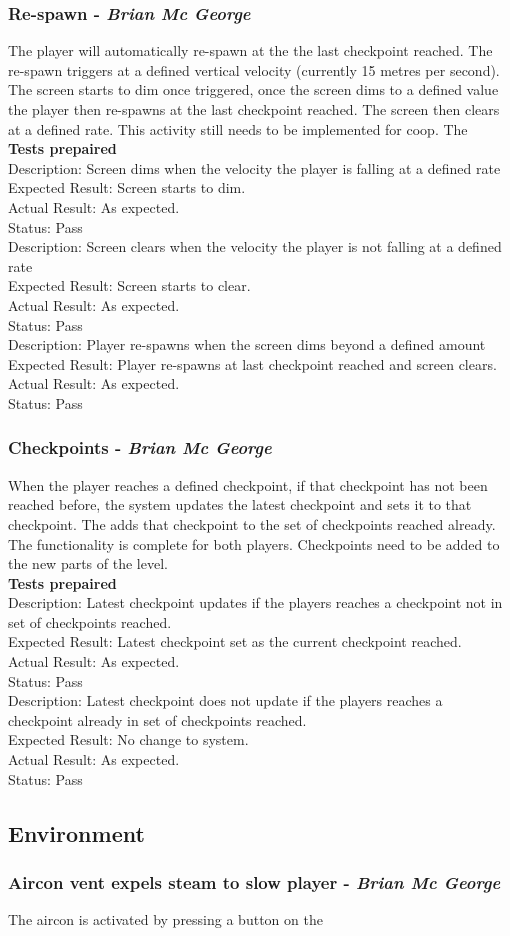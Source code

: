 \documentclass[a4paper,10pt]{article}
\begin{document}
\subsubsection{Re-spawn - \textit{Brian Mc George}}
The player will automatically re-spawn at the the last checkpoint reached. The re-spawn triggers at a defined vertical velocity (currently 15 metres per second). The screen starts to dim once triggered, once the screen dims to a defined value the player then re-spawns at the last checkpoint reached. The screen then clears at a defined rate. This activity still needs to be implemented for coop. The 
\smallskip\\\textbf{Tests prepaired}\\
Description: Screen dims when the velocity the player is falling at a defined rate\\
Expected Result: Screen starts to dim.\\
Actual Result:  As expected.\\
Status: Pass
\smallskip\\
Description: Screen clears when the velocity the player is not falling at a defined rate\\
Expected Result: Screen starts to clear.\\
Actual Result:  As expected.\\
Status: Pass
\smallskip\\
Description: Player re-spawns when the screen dims beyond a defined amount\\
Expected Result: Player re-spawns at last checkpoint reached and screen clears.\\
Actual Result: As expected.\\
Status: Pass
\subsubsection{Checkpoints - \textit{Brian Mc George}}
When the player reaches a defined checkpoint, if that checkpoint has not been reached before, the system updates the latest checkpoint and sets it to that checkpoint. The adds that checkpoint to the set of checkpoints reached already. The functionality is complete for both players. Checkpoints need to be added to the new parts of the level.
\smallskip\\\textbf{Tests prepaired}\\
Description: Latest checkpoint updates if the players reaches a checkpoint not in set of checkpoints reached.\\
Expected Result: Latest checkpoint set as the current checkpoint reached.\\
Actual Result: As expected.\\
Status: Pass
\smallskip\\
Description: Latest checkpoint does not update if the players reaches a checkpoint already in set of checkpoints reached.\\
Expected Result: No change to system.\\
Actual Result: As expected.\\
Status: Pass

\subsection{Environment}
\subsubsection{Aircon vent expels steam to slow player - \textit{Brian Mc George}}
The aircon is activated by pressing a button on the 
\end{document}
